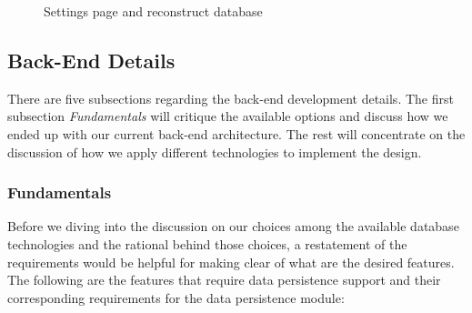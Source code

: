 \documentclass[12pt,a4paper]{article}
\begin{document}
\begin{figure}
                \centering
                \caption{Settings page and reconstruct database}
                \label{fig:settings}
            \end{figure}
            
        \subsection{Back-End Details}
        There are five subsections regarding the back-end development details. The first subsection \textit{Fundamentals} will critique the available options and discuss how we ended up with our current back-end architecture. The rest will concentrate on the discussion of how we apply different technologies to implement the design.
        
            \subsubsection{Fundamentals} %
            \label{db:fundamentals}
            Before we diving into the discussion on our choices among the available database technologies and the rational behind those choices, a restatement of the requirements would be helpful for making clear of what are the desired features. The following are the features that require data persistence support and their corresponding requirements for the data persistence module:
\end{document}
